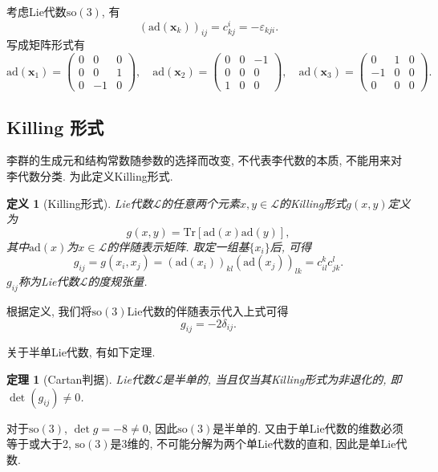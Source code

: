 \documentclass[UTF8]{ctexart}
\newtheorem{thm}{定理}
\newtheorem{define}{定义}
\begin{document}
考虑Lie代数$\mathrm{so}(3)$, 有
\begin{equation}
  (\mathrm{ad}(\bm{x}_k))_{ij} = c_{kj}^i = -\varepsilon_{kji}.
\end{equation}
写成矩阵形式有
\begin{equation}
  \mathrm{ad}(\bm{x}_1) =
  \begin{pmatrix}
    0 & 0 & 0 \\
    0 & 0 & 1 \\
    0 & -1 & 0
  \end{pmatrix}, \quad \mathrm{ad}(\bm{x}_2) =
  \begin{pmatrix}
    0 & 0 & -1 \\
    0 & 0 & 0 \\
    1 & 0 & 0
  \end{pmatrix}, \quad \mathrm{ad}(\bm{x}_3) =
  \begin{pmatrix}
    0 & 1 & 0 \\
    -1 & 0 & 0 \\
    0 & 0 & 0
  \end{pmatrix}.
\end{equation}

\subsection{Killing 形式}
李群的生成元和结构常数随参数的选择而改变, 不代表李代数的本质, 不能用来对李代数分类. 为此定义Killing形式.
\begin{define}[Killing形式]
  Lie代数$\mathcal{L}$的任意两个元素$x, y \in \mathcal{L}$的Killing形式$g(x,y)$定义为
  \begin{equation}
    g(x,y) = \mathrm{Tr}[\mathrm{ad}(x) \mathrm{ad}(y)],
  \end{equation}
其中$\mathrm{ad}(x)$为$x \in \mathcal{L}$的伴随表示矩阵. 取定一组基$\{x_i\}$后, 可得
\begin{equation}
  g_{ij}=g(x_i,x_j) = (\mathrm{ad}(x_i))_{kl}(\mathrm{ad}(x_j))_{lk} = c_{il}^kc_{jk}^l.
\end{equation}
$g_{ij}$称为Lie代数$\mathcal{L}$的度规张量.
\end{define}

根据定义, 我们将$\mathrm{so}(3)$Lie代数的伴随表示代入上式可得
\begin{equation}
  g_{ij} = -2\delta_{ij}.
\end{equation}

关于半单Lie代数, 有如下定理.
\begin{thm}[Cartan判据]
  Lie代数$\mathcal{L}$是半单的, 当且仅当其Killing形式为非退化的, 即$\det (g_{ij}) \neq 0$.
\end{thm}

对于$\mathrm{so}(3)$, $\det g = -8 \neq 0$, 因此$\mathrm{so}(3)$是半单的. 又由于单Lie代数的维数必须等于或大于2, $\mathrm{so}(3)$是3维的, 不可能分解为两个单Lie代数的直和, 因此是单Lie代数.
\end{document}
